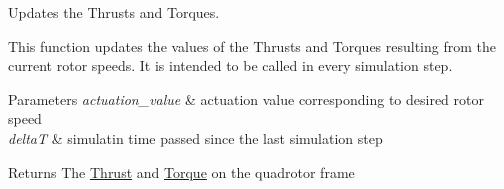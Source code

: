\-Updates the \-Thrusts and \-Torques. 

\-This function updates the values of the \-Thrusts and \-Torques resulting from the current rotor speeds. \-It is intended to be called in every simulation step. 
\begin{DoxyParams}{\-Parameters}
{\em actuation\-\_\-value} & actuation value corresponding to desired rotor speed \\
\hline
{\em delta\-T} & simulatin time passed since the last simulation step \\
\hline
\end{DoxyParams}
\begin{DoxyReturn}{\-Returns}
\-The \hyperlink{classThrust}{\-Thrust} and \hyperlink{classTorque}{\-Torque} on the quadrotor frame 
\end{DoxyReturn}


